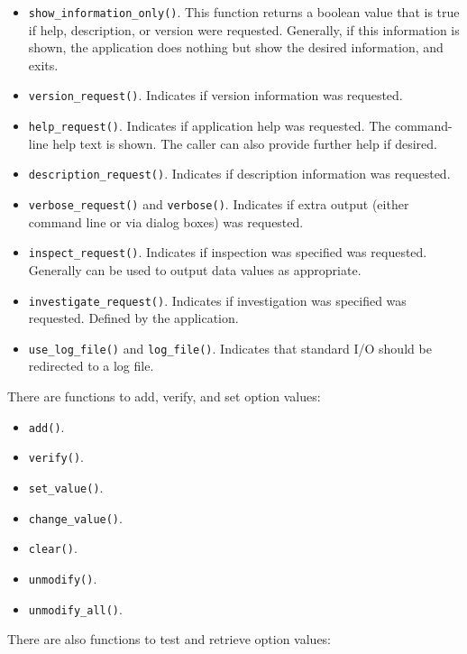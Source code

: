    \begin{itemize}
      \item \texttt{show\_information\_only()}.
         This function returns a boolean value that is true if
         help, description, or version were requested.
         Generally, if this information is shown, the application does
         nothing but show the desired information, and exits.
      \item \texttt{version\_request()}.
         Indicates if version information was requested.
      \item \texttt{help\_request()}.
         Indicates if application help was requested.
         The command-line help text is shown.
         The caller can also provide further help if desired.
      \item \texttt{description\_request()}.
         Indicates if description information was requested.
      \item \texttt{verbose\_request()} and \texttt{verbose()}.
         Indicates if extra output (either command line or via
         dialog boxes) was requested.
      \item \texttt{inspect\_request()}.
         Indicates if inspection was specified was requested.
         Generally can be used to output data values as appropriate.
      \item \texttt{investigate\_request()}.
         Indicates if investigation was specified was requested.
         Defined by the application.
      \item \texttt{use\_log\_file()} and \texttt{log\_file()}.
         Indicates that standard I/O should be redirected to a log file.
   \end{itemize}

   There are functions to add, verify, and set option values:

   \begin{itemize}
      \item \texttt{add()}.
      \item \texttt{verify()}.
      \item \texttt{set\_value()}.
      \item \texttt{change\_value()}.
      \item \texttt{clear()}.
      \item \texttt{unmodify()}.
      \item \texttt{unmodify\_all()}.
   \end{itemize}

   There are also functions to test and retrieve option values:

